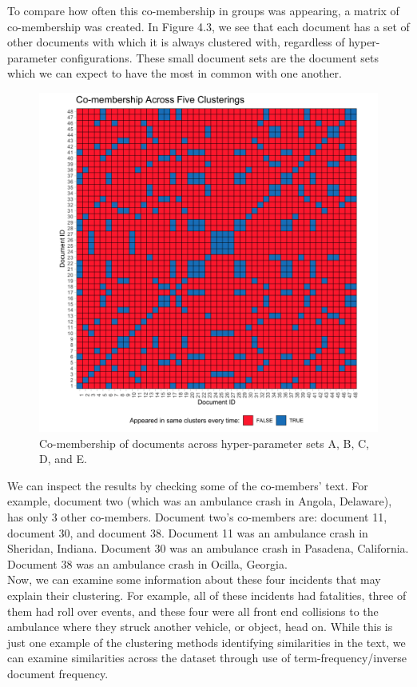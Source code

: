 To compare how often this co-membership in groups was appearing, a matrix of co-membership was created. In Figure 4.3, we see that each document has a set of other documents with which it is always clustered with, regardless of hyper-parameter configurations. These small document sets are the document sets which we can expect to have the most in common with one another.\\

\begin{figure}
\includegraphics[width=6in]{Content/Images/comembers5.png}
\caption{Co-membership of documents across hyper-parameter sets A, B, C, D, and E.}
\end{figure}

We can inspect the results by checking some of the co-members' text. For example, document two (which was an ambulance crash in Angola, Delaware), has only 3 other co-members. Document two's co-members are: document 11, document 30, and document 38. Document 11 was an ambulance crash in Sheridan, Indiana. Document 30 was an ambulance crash in Pasadena, California. Document 38 was an ambulance crash in Ocilla, Georgia.\\

Now, we can examine some information about these four incidents that may explain their clustering. For example, all of these incidents had fatalities, three of them had roll over events, and these four were all front end collisions to the ambulance where they struck another vehicle, or object, head on. While this is just one example of the clustering methods identifying similarities in the text, we can examine similarities across the dataset through use of term-frequency/inverse document frequency.\\

